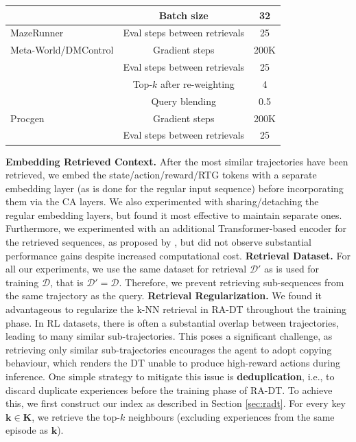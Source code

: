 \documentclass{article}
\begin{document}
\begin{table}[]
\begin{tabular}{l | c c}
      &      Batch size & 32 \\
     \midrule
     MazeRunner &      Eval steps between retrievals & 25 \\
    \midrule
     Meta-World/DMControl &  Gradient steps & 200K \\
      &                      Eval steps between retrievals & 25 \\
      &      Top-$k$ after re-weighting & 4 \\
      &  Query blending                 & 0.5 \\
    \midrule
     Procgen &      Gradient steps & 200K \\
             &      Eval steps between retrievals & 25 \\
    \bottomrule
    \end{tabular}
    \label{tab:radt-hparams}
\end{table}
\textbf{Embedding Retrieved Context.}
After the most similar trajectories have been retrieved, we embed the state/action/reward/RTG tokens with a separate embedding layer (as is done for the regular input sequence) before incorporating them via the CA layers.
We also experimented with sharing/detaching the regular embedding layers, but found it most effective to maintain separate ones.
Furthermore, we experimented with an additional Transformer-based encoder for the retrieved sequences, as proposed by \citet{Borgeaud:22}, but did not observe substantial performance gains despite increased computational cost.
\textbf{Retrieval Dataset.}
For all our experiments, we use the same dataset for retrieval $\mathcal{D}'$ as is used for training $\mathcal{D}$, that is $\mathcal{D}'=\mathcal{D}$.
Therefore, we prevent retrieving sub-sequences from the same trajectory as the query.
\textbf{Retrieval Regularization.}
We found it advantageous to regularize the k-NN retrieval in RA-DT throughout the training phase.
In RL datasets, there is often a substantial overlap between trajectories, leading to many similar sub-trajectories.
This poses a significant challenge, as retrieving only similar sub-trajectories encourages the agent to adopt copying behaviour, which renders the DT unable to produce high-reward actions during inference.
One simple strategy to mitigate this issue is \textbf{deduplication}, i.e., to discard duplicate experiences before the training phase of RA-DT.
To achieve this, we first construct our index as described in Section \ref{sec:radt}.
For every key $\mathbf{k} \in \mathbf{K}$, we retrieve the top-$k$ neighbours (excluding experiences from the same episode as $\mathbf{k}$).
\end{document}
